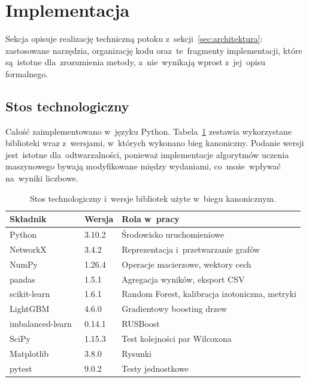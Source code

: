 \section{Implementacja}
\label{sec:implementacja}

Sekcja opisuje realizację techniczną potoku z~sekcji~\ref{sec:architektura}:
zastosowane narzędzia, organizację kodu oraz~te~fragmenty implementacji,
które są~istotne dla~zrozumienia metody, a~nie~wynikają wprost z~jej~opisu
formalnego.

\subsection{Stos technologiczny}

Całość zaimplementowano w~języku Python. Tabela~\ref{tab:stos} zestawia
wykorzystane biblioteki wraz z~wersjami, w~których wykonano bieg kanoniczny.
Podanie wersji jest~istotne dla~odtwarzalności, ponieważ implementacje algorytmów
uczenia maszynowego bywają modyfikowane między wydaniami, co~może~wpływać
na~wyniki liczbowe.

\begin{table}[ht]
\centering
\caption{Stos technologiczny i~wersje bibliotek użyte w~biegu kanonicznym.}
\label{tab:stos}
\begin{tabular}{lll}
\toprule
\textbf{Składnik} & \textbf{Wersja} & \textbf{Rola w~pracy} \\
\midrule
Python~\cite{Python}                 & 3.10.2  & Środowisko uruchomieniowe \\
NetworkX~\cite{NetworkX}             & 3.4.2   & Reprezentacja i~przetwarzanie grafów \\
NumPy~\cite{NumPy}                   & 1.26.4  & Operacje macierzowe, wektory cech \\
pandas~\cite{pandas}                 & 1.5.1   & Agregacja wyników, eksport CSV \\
scikit-learn~\cite{scikit-learn}     & 1.6.1   & Random Forest, kalibracja izotoniczna, metryki \\
LightGBM~\cite{Ke2017}               & 4.6.0   & Gradientowy boosting drzew \\
imbalanced-learn~\cite{imblearn}     & 0.14.1  & RUSBoost \\
SciPy~\cite{SciPy}                   & 1.15.3  & Test kolejności par Wilcoxona \\
Matplotlib~\cite{Matplotlib}         & 3.8.0   & Rysunki \\
pytest~\cite{pytest}                 & 9.0.2   & Testy jednostkowe \\
\bottomrule
\end{tabular}
\end{table}

